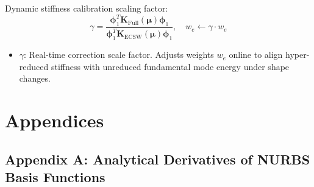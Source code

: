 \documentclass[12pt,a4paper,oneside]{report}
\begin{document}
Dynamic stiffness calibration scaling factor:
\begin{equation}
    \gamma = \frac{\boldsymbol{\phi}_1^T \mathbf{K}_{\text{Full}}(\boldsymbol{\mu}) \boldsymbol{\phi}_1}{\boldsymbol{\phi}_1^T \mathbf{K}_{\text{ECSW}}(\boldsymbol{\mu}) \boldsymbol{\phi}_1}, \quad w_e \leftarrow \gamma \cdot w_e
\end{equation}
\begin{tcolorbox}[colback=gray!5!white,colframe=gray!60!black,title={Term Definitions \& Parameter Dependencies}]
\begin{itemize}
    \item $\gamma$: Real-time correction scale factor. Adjusts weights $w_e$ online to align hyper-reduced stiffness with unreduced fundamental mode energy under shape changes.
\end{itemize}
\end{tcolorbox}


\chapter*{Appendices}

\section*{Appendix A: Analytical Derivatives of NURBS Basis Functions}
\end{document}
